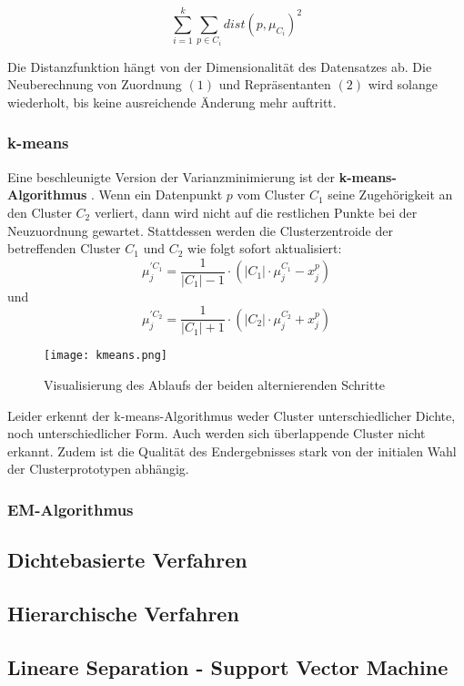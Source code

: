 \documentclass[11pt,fleqn]{book}
\begin{document}
$$\sum_{i=1}^{k}\sum_{p \in C_i}^{} dist(p,\mu_{C_i})^2$$

Die Distanzfunktion hängt von der Dimensionalität des Datensatzes ab. Die Neuberechnung von Zuordnung $(1)$ und Repräsentanten $(2)$ wird solange wiederholt, bis keine ausreichende Änderung mehr auftritt.

\subsubsection{k-means}

Eine beschleunigte Version der Varianzminimierung ist der \textbf{k-means-Algorithmus} \cite{forgy}. Wenn ein Datenpunkt $p$ vom Cluster $C_1$ seine Zugehörigkeit an den Cluster $C_2$ verliert, dann wird nicht auf die restlichen Punkte bei der Neuzuordnung gewartet. Stattdessen werden die Clusterzentroide der betreffenden Cluster $C_1$ und $C_2$ wie folgt sofort aktualisiert:
$$\mu_j^{\prime C_1} = \frac{1}{|C_1|-1}\cdot(|C_1|\cdot \mu_j^{C_1} - x_j^p)$$ und $$\mu_j^{\prime C_2} = \frac{1}{|C_1|+1}\cdot(|C_2|\cdot \mu_j^{C_2} + x_j^p)$$ 

\begin{figure}[h]
\centering
\texttt{[image: kmeans.png]}
\caption{Visualisierung des Ablaufs der beiden alternierenden Schritte}\label{cluster}
\end{figure}

Leider erkennt der k-means-Algorithmus weder Cluster unterschiedlicher Dichte, noch unterschiedlicher Form. Auch werden sich überlappende Cluster nicht erkannt. Zudem ist die Qualität des Endergebnisses stark von der initialen Wahl der Clusterprototypen abhängig.

\subsubsection{EM-Algorithmus}


\subsection{Dichtebasierte Verfahren}
\subsection{Hierarchische Verfahren}
\subsection{Lineare Separation - Support Vector Machine}
\end{document}
